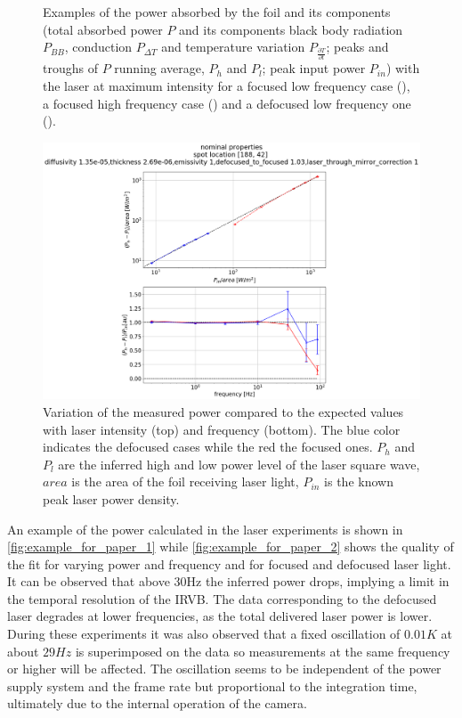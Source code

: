 \begin{figure}[!ht]
\begin{subfigure}{0.62\linewidth}
        \vspace*{-5mm}
        {\color{white}\caption{\phantom{ }}\label{fig:example_for_paper_12}}
     \end{subfigure}
        \caption{Examples of the power absorbed by the foil and its components (total absorbed power $P$ and its components black body radiation $P_{BB}$, conduction $P_{\Delta T}$ and temperature variation $P_{\frac {\partial T} {\partial t}}$; peaks and troughs of $P$ running average, $P_h$ and $P_l$; peak input power $P_{in}$) with the laser at maximum intensity for a focused low frequency case (), a focused high frequency case () and a defocused low frequency one ().}
        \label{fig:example_for_paper_1}
\end{figure}

\begin{figure}[!ht]
	\centering
	\includegraphics[trim={290 0 330 100},clip,width=0.65\linewidth]{Chapters/chapter2/figs/example_for_paper_24.png}
	\caption{Variation of the measured power compared to the expected values with laser intensity (top) and frequency (bottom). The blue color indicates the defocused cases while the red the focused ones. $P_h$ and $P_l$ are the inferred high and low power level of the laser square wave, $area$ is the area of the foil receiving laser light, $P_{in}$ is the known peak laser power density.}
	\label{fig:example_for_paper_2}
\end{figure}

An example of the power calculated in the laser experiments is shown in \autoref{fig:example_for_paper_1} while \autoref{fig:example_for_paper_2} shows the quality of the fit for varying power and frequency and for focused and defocused laser light. It can be observed that above 30Hz the inferred power drops, implying a limit in the temporal resolution of the IRVB. The data corresponding to the defocused laser degrades at lower frequencies, as the total delivered laser power is lower. During these experiments it was also observed that a fixed oscillation of $0.01K$ at about $29Hz$ is superimposed on the data so measurements at the same frequency or higher will be affected. The oscillation seems to be independent of the power supply system and the frame rate but proportional to the integration time, ultimately due to the internal operation of the camera.


